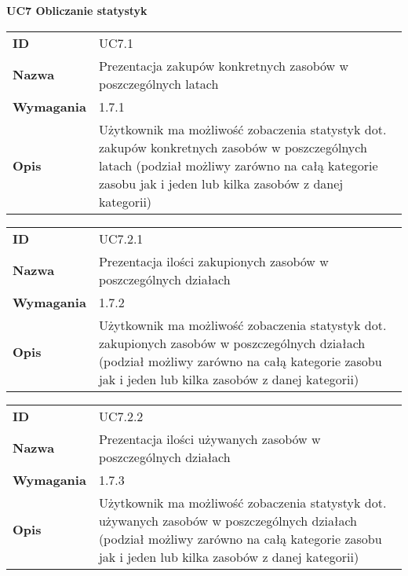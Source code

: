 \vspace{.03\textheight}
\begin{center}
  {\Large\bf UC7 Obliczanie statystyk }
\end{center}
\vspace{.02\textheight}

\begin{tabular}{p{}p{}}
\hfill {\bf ID} & UC7.1 \\
\hfill {\bf Nazwa} &  Prezentacja zakupów konkretnych zasobów w poszczególnych latach \\
\hfill {\bf Wymagania} & 1.7.1 \\
\hfill {\bf Opis} & Użytkownik ma możliwość zobaczenia statystyk dot. zakupów konkretnych zasobów w poszczególnych latach (podział możliwy zarówno na całą kategorie zasobu jak i jeden lub kilka zasobów z danej kategorii) \\
\end{tabular}

\vspace{.05\textheight}

\begin{tabular}{p{}p{}}
\hfill {\bf ID} &  UC7.2.1 \\
\hfill {\bf Nazwa} & Prezentacja ilości zakupionych zasobów w poszczególnych działach \\
\hfill {\bf Wymagania} & 1.7.2 \\
\hfill {\bf Opis} & Użytkownik ma możliwość zobaczenia statystyk dot. zakupionych zasobów w poszczególnych działach (podział możliwy zarówno na całą kategorie zasobu jak i jeden lub kilka zasobów z danej kategorii) \\
\end{tabular}

\vspace{.05\textheight}

\begin{tabular}{p{}p{}}
\hfill {\bf ID} & UC7.2.2 \\
\hfill {\bf Nazwa} & Prezentacja ilości używanych zasobów w poszczególnych działach \\
\hfill {\bf Wymagania} & 1.7.3 \\
\hfill {\bf Opis} & Użytkownik ma możliwość zobaczenia statystyk dot. używanych zasobów w poszczególnych działach (podział możliwy zarówno na całą kategorie zasobu jak i jeden lub kilka zasobów z danej kategorii) \\
\end{tabular}

